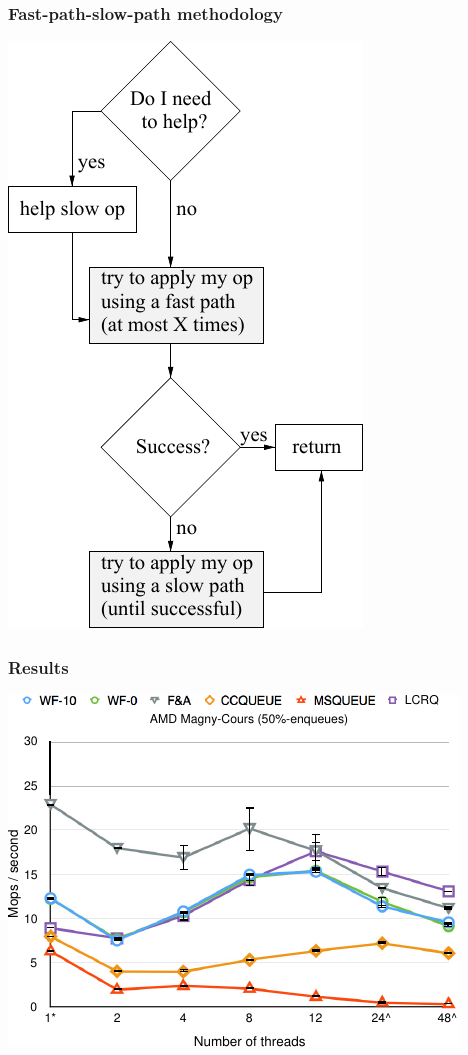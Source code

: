 \documentclass[10pt,a4paper]{beamer}
\begin{document}
\begin{frame}
  \frametitle{Fast-path-slow-path methodology}
  \center
  \includegraphics[scale=0.8]{../synthese/img/fpsp.pdf}
\end{frame}

\begin{frame}
  \frametitle{Results}
  \center
  \includegraphics[scale=1.3]{../synthese/img/courbe.pdf}
\end{frame}
\end{document}
